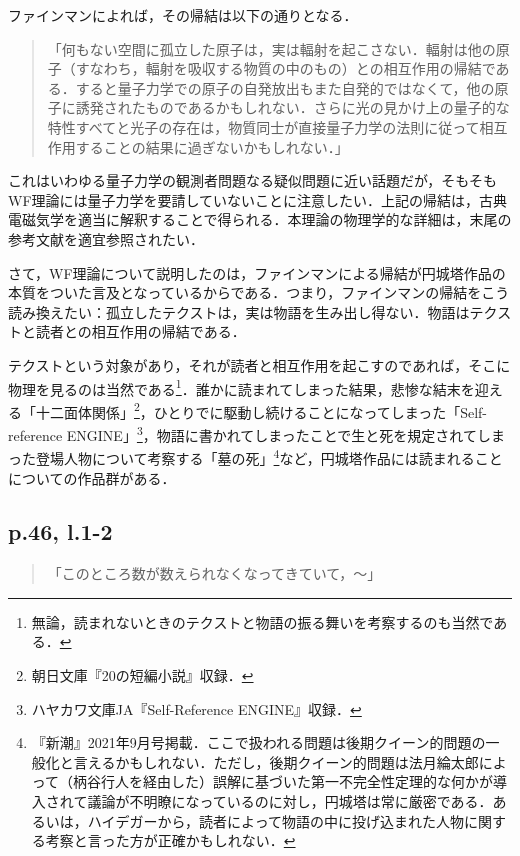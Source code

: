 \documentclass[10pt, a5paper, twoside]{jsarticle}
\theoremstyle{definition}
\begin{document}
			ファインマンによれば，その帰結は以下の通りとなる\cite{thesis}．

			\begin{quote}

				「何もない空間に孤立した原子は，実は輻射を起こさない．輻射は他の原子（すなわち，輻射を吸収する物質の中のもの）との相互作用の帰結である．すると量子力学での原子の自発放出もまた自発的ではなくて，他の原子に誘発されたものであるかもしれない．さらに光の見かけ上の量子的な特性すべてと光子の存在は，物質同士が直接量子力学の法則に従って相互作用することの結果に過ぎないかもしれない．」
				
			\end{quote}

			これはいわゆる量子力学の観測者問題なる疑似問題に近い話題だが，そもそもWF理論には量子力学を要請していないことに注意したい．上記の帰結は，古典電磁気学を適当に解釈することで得られる．本理論の物理学的な詳細は，末尾の参考文献を適宜参照されたい．

			さて，WF理論について説明したのは，ファインマンによる帰結が円城塔作品の本質をついた言及となっているからである．つまり，ファインマンの帰結をこう読み換えたい：孤立したテクストは，実は物語を生み出し得ない．物語はテクストと読者との相互作用の帰結である．

			テクストという対象があり，それが読者と相互作用を起こすのであれば，そこに物理を見るのは当然である\footnote{無論，読まれないときのテクストと物語の振る舞いを考察するのも当然である．}．誰かに読まれてしまった結果，悲惨な結末を迎える「十二面体関係」\footnote{朝日文庫『20の短編小説』収録．}，ひとりでに駆動し続けることになってしまった「Self-reference ENGINE」\footnote{ハヤカワ文庫JA『Self-Reference ENGINE』収録．}，物語に書かれてしまったことで生と死を規定されてしまった登場人物について考察する「墓の死」\footnote{『新潮』2021年9月号掲載．ここで扱われる問題は後期クイーン的問題の一般化と言えるかもしれない．ただし，後期クイーン的問題は法月綸太郎によって（柄谷行人を経由した）誤解に基づいた第一不完全性定理的な何かが導入されて議論が不明瞭になっているのに対し，円城塔は常に厳密である．あるいは，ハイデガーから，読者によって物語の中に投げ込まれた人物に関する考察と言った方が正確かもしれない．}など，円城塔作品には読まれることについての作品群がある．

		\subsection{p.46, l.1-2}

			\begin{quote}

				「このところ数が数えられなくなってきていて，〜」
				
			\end{quote}
\end{document}
